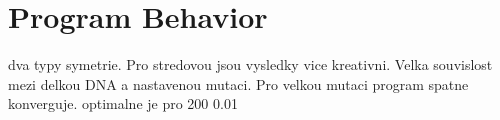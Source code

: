 \section{Program Behavior}
dva typy symetrie. Pro stredovou jsou vysledky vice kreativni. 
Velka souvislost mezi delkou DNA a nastavenou mutaci. Pro velkou mutaci program spatne konverguje. optimalne je pro 200 0.01